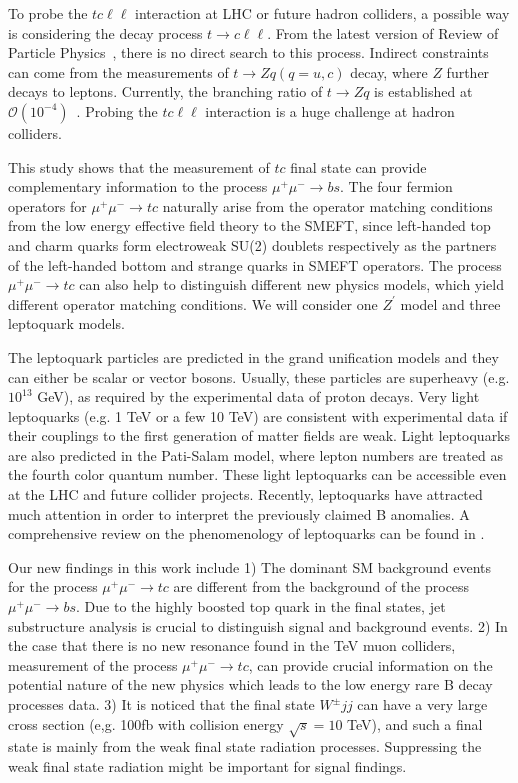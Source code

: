 \documentclass[a4paper,11pt]{article}
\begin{document}
To probe the $tc\ell\ell$ interaction at LHC or future hadron colliders,    
a possible way is considering the decay process $t\to c\ell\ell$.
From the latest version of Review of Particle Physics~\cite{ParticleDataGroup:2022pth}, 
there is no direct search to this process. 
Indirect constraints can come from the measurements of $t\to Zq(q=u,c)$ decay, 
where $Z$ further decays to leptons. 
Currently, the branching ratio of $t\to Zq$ is established at $\mathcal{O}(10^{-4})$~\cite{ATLAS:2015vhj,CMS:2017wcz,ATLAS:2018zsq}.
Probing the $tc\ell\ell$ interaction is a huge challenge at hadron colliders. 

This study shows that the measurement of $tc$ final state can provide complementary information to the process $\mu^+\mu^-\to b s$.
The four fermion operators for $\mu^+\mu^-\to tc$ naturally arise from the operator matching conditions from the low energy effective field theory to the SMEFT, 
since left-handed top and charm quarks form electroweak SU(2) doublets respectively as the partners of the left-handed bottom and strange quarks in SMEFT operators. 
The process $\mu^+\mu^-\to tc$ can also help to distinguish different new physics models, which yield different operator matching conditions. 
We will consider one $Z^\prime$ model and three leptoquark models.
 
The leptoquark particles are predicted in the grand unification models and they can either be scalar or vector bosons. 
Usually, these particles are superheavy (e.g. $10^{13}$ GeV), as required by the experimental data of proton decays. 
Very light leptoquarks (e.g. 1 TeV or a few 10 TeV) are consistent with experimental data if their couplings to the first generation of matter fields are weak. 
Light leptoquarks are also predicted in the Pati-Salam model, where lepton numbers are treated as the fourth color quantum number. 
These light leptoquarks can be accessible even at the LHC and future collider projects. 
Recently, leptoquarks have attracted much attention in order to interpret the previously claimed B anomalies. 
A comprehensive review on the phenomenology of leptoquarks can be found in \cite{Dorsner:2016wpm}.

Our new findings in this work include 
1) The dominant SM background events for the process $\mu^+\mu^-\to tc$ are different from the background of the process $\mu^+\mu^-\to bs$. 
Due to the highly boosted top quark in the final states, jet substructure analysis is crucial to distinguish signal and background events. 
2) In the case that there is no new resonance found in the TeV muon colliders, measurement of the process $\mu^+\mu^-\to tc$, 
can provide crucial information on the potential nature of the new physics which leads to the low energy rare B decay processes data. 
3) It is noticed that the final state $W^\pm jj $ can have a very large cross section (e,g. 100fb with collision energy $\sqrt{s}=10$ TeV), 
and such a final state is mainly from the weak final state radiation processes. 
Suppressing the weak final state radiation might be important for signal findings.
\end{document}
